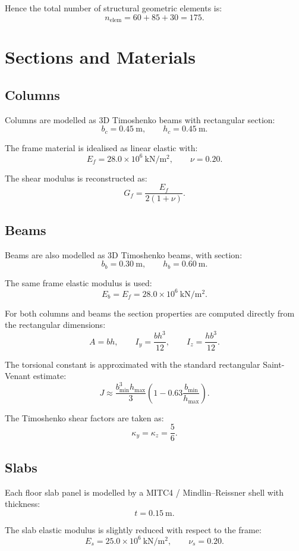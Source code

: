 Hence the total number of structural geometric elements is:
\[
n_\mathrm{elem} = 60 + 85 + 30 = 175.
\]

\section{Sections and Materials}

\subsection{Columns}

Columns are modelled as 3D Timoshenko beams with rectangular section:
\[
b_c = 0.45\ \mathrm{m},
\qquad
h_c = 0.45\ \mathrm{m}.
\]

The frame material is idealised as linear elastic with:
\[
E_f = 28.0 \times 10^6\ \mathrm{kN/m^2},
\qquad
\nu = 0.20.
\]

The shear modulus is reconstructed as:
\[
G_f = \frac{E_f}{2(1+\nu)}.
\]

\subsection{Beams}

Beams are also modelled as 3D Timoshenko beams, with section:
\[
b_b = 0.30\ \mathrm{m},
\qquad
h_b = 0.60\ \mathrm{m}.
\]

The same frame elastic modulus is used:
\[
E_b = E_f = 28.0 \times 10^6\ \mathrm{kN/m^2}.
\]

For both columns and beams the section properties are computed directly from
the rectangular dimensions:
\[
A = b h,
\qquad
I_y = \frac{b h^3}{12},
\qquad
I_z = \frac{h b^3}{12}.
\]

The torsional constant is approximated with the standard rectangular
Saint-Venant estimate:
\[
J \approx \frac{b_\text{min}^3 h_\text{max}}{3}
\left(1 - 0.63 \frac{b_\text{min}}{h_\text{max}}\right).
\]

The Timoshenko shear factors are taken as:
\[
\kappa_y = \kappa_z = \frac{5}{6}.
\]

\subsection{Slabs}

Each floor slab panel is modelled by a MITC4 / Mindlin--Reissner shell with
thickness:
\[
t = 0.15\ \mathrm{m}.
\]

The slab elastic modulus is slightly reduced with respect to the frame:
\[
E_s = 25.0 \times 10^6\ \mathrm{kN/m^2},
\qquad
\nu_s = 0.20.
\]

